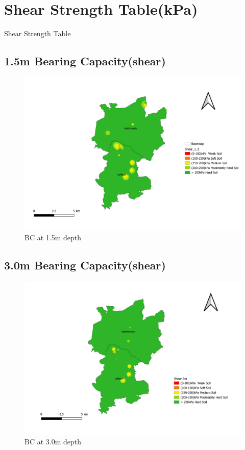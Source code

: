 \section{Shear Strength Table(kPa)}
\begin{table}[!h]
\caption{Shear Strength Table}

\end{table}
\pagebreak

\begin{landscape}
\section{1.5m Bearing Capacity(shear)}
\begin{figure}[!hbt]
\includegraphics[width=0.8\linewidth, height=0.8\textheight,keepaspectratio]{in/map/Shear_1_5.png}
\caption{BC at 1.5m depth}
\end{figure}
\pagebreak
\end{landscape}

\begin{landscape}
\section{3.0m Bearing Capacity(shear)}
\begin{figure}[!hbt]
\centering
\includegraphics[width=0.8\linewidth, height=0.8\textheight,keepaspectratio]{in/map/Shear_3_0.png}
\caption{BC at 3.0m depth}
\end{figure}
\pagebreak
\end{landscape}

